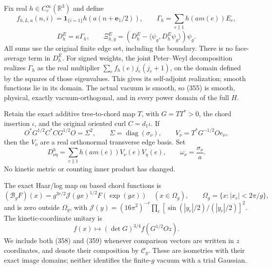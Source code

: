 \documentclass[
  11pt,
]{article}
\begin{document}
Fix real \(h\in C_c^\infty(\mathbb R^3)\) and define \[
 f_{h,L,a}(n,i)=\mathbf1_{\{i=1\}}h(a(n+\mathbf e_1/2)),\qquad
 \Gamma_h=\sum_{e\parallel1}h(am(e))E_e,
 \tag{354}
\] \[
 D^E_h=\kappa\Gamma_h,\qquad
 \Xi^E_{h,g}=(D^E_h-\langle\psi_g,D^E_h\psi_g\rangle)\psi_g.
 \tag{355}
\] All sums use the original finite edge set, including the boundary.
There is no face-average term in \(D^E_h\). For signed weights, the
joint Peter--Weyl decomposition realizes \(\Gamma_h\) as the real
multiplier \(\sum_e f_h(e)j_e(j_e+1)\), on the domain defined by the
squares of those eigenvalues. This gives its self-adjoint realization;
smooth functions lie in its domain. The actual vacuum is smooth, so
(355) is smooth, physical, exactly vacuum-orthogonal, and in every power
domain of the full \(H\).

Retain the exact additive tree-to-chord map \(T\), with \(G=TT^*>0\),
the chord insertion \(\iota\), and the original oriented curl
\(C=d_1\iota\). If \[
 O^*G^{1/2}C^*CG^{1/2}O=\Sigma^2,\qquad
 \Sigma=\operatorname{diag}(\sigma_\nu),\qquad
 V_\nu=T^*G^{-1/2}Oe_\nu,
 \tag{356}
\] then the \(V_\nu\) are a real orthonormal transverse edge basis. Set
\[
 D^h_{\nu\eta}=\sum_{e\parallel1}h(am(e))V_\nu(e)V_\eta(e),
 \qquad \omega_\nu=\frac{\sigma_\nu}{a}.
 \tag{357}
\] No kinetic metric or counting inner product has changed.

The exact Haar/log map on based chord functions is \[
 (\mathcal B_gF)(x)
 =g^{3r/2}\mathcal J(gx)^{1/2}F(\exp(gx))
 \quad(x\in\Omega_g),\qquad
 \Omega_g=\{x:|x_c|<2\pi/g\},
 \tag{358}
\] and is zero outside \(\Omega_g\), with \(\mathcal J(y)=(16\pi^2)^{-r}
\prod_c[\sin(|y_c|/2)/(|y_c|/2)]^2\). The kinetic-coordinate unitary is
\[
 f(x)\longmapsto(\det G)^{3/4}f(G^{1/2}Oz).
 \tag{359}
\] We include both (358) and (359) whenever comparison vectors are
written in \(z\) coordinates, and denote their composition by
\(\mathcal C_g\). These are isometries with their exact image domains;
neither identifies the finite-\(g\) vacuum with a trial Gaussian.
\end{document}

